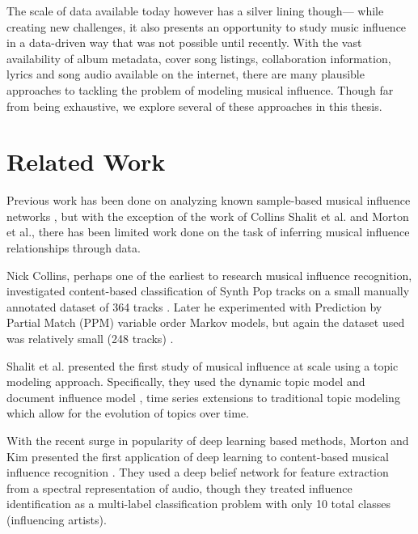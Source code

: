 The scale of data available today however has a silver lining though--- while creating new challenges, it also presents an opportunity to study music influence in a data-driven way that was not possible until recently. With the vast availability of album metadata, cover song listings, collaboration information, lyrics and song audio available on the internet, there are many plausible approaches to tackling the problem of modeling musical influence. Though far from being exhaustive, we explore several of these approaches in this thesis.

\section{Related Work}
Previous work has been done on analyzing known sample-based musical influence networks \cite{bryan2011musical}, but with the exception of the work of Collins \cite{collins2010computational, collins2012influence}Shalit et al. \cite{shalit2013modeling} and Morton et al.\cite{morton2015acoustic}, there has been limited work done on the task of inferring musical influence relationships through data.

Nick Collins, perhaps one of the earliest to research musical influence recognition, investigated content-based classification of Synth Pop tracks on a small manually annotated dataset of 364 tracks \cite{collins2010computational}. Later he experimented with Prediction by Partial Match (PPM) variable order Markov models, but again the dataset used was relatively small (248 tracks) \cite{collins2012influence}. 

Shalit et al. \cite{shalit2013modeling} presented the first study of musical influence at scale using a topic modeling approach. Specifically, they used the dynamic topic model \cite{blei2006dynamic} and document influence model \cite{gerrish2010language}, time series extensions to traditional topic modeling which allow for the evolution of topics over time. 

With the recent surge in popularity of deep learning based methods, Morton and Kim presented the first application of deep learning to content-based musical influence recognition \cite{morton2015acoustic}. They used a deep belief network for feature extraction from a spectral representation of audio, though they treated influence identification as a multi-label classification problem with only 10 total classes (influencing artists).

